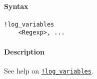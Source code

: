 


	\paragraph{Syntax}\label{syntax}

\begin{verbatim}
!log_variables
    <Regexp>, ...
\end{verbatim}

\paragraph{Description}\label{description}

See help on \href{modellang/logvariables}{\texttt{!log\_variables}}.


